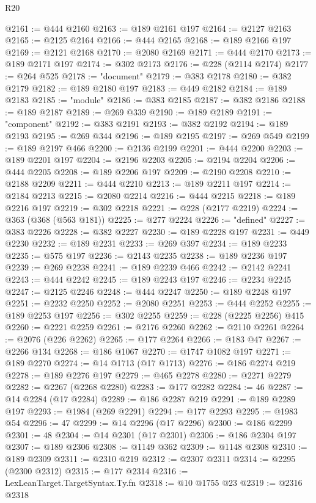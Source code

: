 \begin{lexlean}{R20}
\begin{coremodule}
@2161 := @444 @2160
@2163 := @189 @2161 @197
@2164 := @2127 @2163
@2165 := @2125 @2164
@2166 := @444 @2165
@2168 := @189 @2166 @197
@2169 := @2121 @2168
@2170 := @2080 @2169
@2171 := @444 @2170
@2173 := @189 @2171 @197
@2174 := @302 @2173
@2176 := @228 (@2114 @2174)
@2177 := @264 @525
@2178 := "document"
@2179 := @383 @2178
@2180 := @382 @2179
@2182 := @189 @2180 @197
@2183 := @449 @2182
@2184 := @189 @2183
@2185 := "module"
@2186 := @383 @2185
@2187 := @382 @2186
@2188 := @189 @2187
@2189 := @269 @339
@2190 := @189 @2189
@2191 := "component"
@2192 := @383 @2191
@2193 := @382 @2192
@2194 := @189 @2193
@2195 := @269 @344
@2196 := @189 @2195
@2197 := @269 @549
@2199 := @189 @2197 @466
@2200 := @2136 @2199
@2201 := @444 @2200
@2203 := @189 @2201 @197
@2204 := @2196 @2203
@2205 := @2194 @2204
@2206 := @444 @2205
@2208 := @189 @2206 @197
@2209 := @2190 @2208
@2210 := @2188 @2209
@2211 := @444 @2210
@2213 := @189 @2211 @197
@2214 := @2184 @2213
@2215 := @2080 @2214
@2216 := @444 @2215
@2218 := @189 @2216 @197
@2219 := @302 @2218
@2221 := @228 (@2177 @2219)
@2224 := @363 (@368 (@563 @181))
@2225 := @277 @2224
@2226 := "defined"
@2227 := @383 @2226
@2228 := @382 @2227
@2230 := @189 @2228 @197
@2231 := @449 @2230
@2232 := @189 @2231
@2233 := @269 @397
@2234 := @189 @2233
@2235 := @575 @197
@2236 := @2143 @2235
@2238 := @189 @2236 @197
@2239 := @269 @2238
@2241 := @189 @2239 @466
@2242 := @2142 @2241
@2243 := @444 @2242
@2245 := @189 @2243 @197
@2246 := @2234 @2245
@2247 := @2125 @2246
@2248 := @444 @2247
@2250 := @189 @2248 @197
@2251 := @2232 @2250
@2252 := @2080 @2251
@2253 := @444 @2252
@2255 := @189 @2253 @197
@2256 := @302 @2255
@2259 := @228 (@2225 @2256) @415
@2260 := @2221 @2259
@2261 := @2176 @2260
@2262 := @2110 @2261
@2264 := @2076 (@226 @2262)
@2265 := @177 @2264
@2266 := @183 @47
@2267 := @2266 @134
@2268 := @186 @1067
@2270 := @1747 @1082 @197
@2271 := @189 @2270
@2274 := @14 @1713 (@17 @1713)
@2276 := @186 @2274 @219
@2278 := @189 @2276 @197
@2279 := @465 @2278
@2280 := @2271 @2279
@2282 := @2267 (@2268 @2280)
@2283 := @177 @2282
@2284 := 46
@2287 := @14 @2284 (@17 @2284)
@2289 := @186 @2287 @219
@2291 := @189 @2289 @197
@2293 := @1984 (@269 @2291)
@2294 := @177 @2293
@2295 := @1983 @54
@2296 := 47
@2299 := @14 @2296 (@17 @2296)
@2300 := @186 @2299
@2301 := 48
@2304 := @14 @2301 (@17 @2301)
@2306 := @186 @2304 @197
@2307 := @189 @2306
@2308 := @1149 @362
@2309 := @1148 @2308
@2310 := @189 @2309
@2311 := @2310 @219
@2312 := @2307 @2311
@2314 := @2295 (@2300 @2312)
@2315 := @177 @2314
@2316 := LexLeanTarget.TargetSyntax.Ty.fn
@2318 := @10 @1755 @23
@2319 := @2316 @2318

\end{coremodule}
\end{lexlean}
